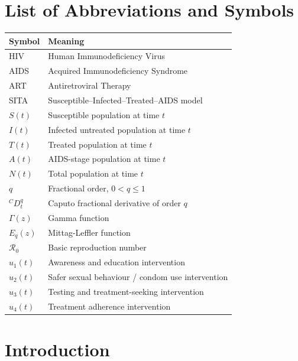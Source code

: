 \documentclass[12pt,a4paper,oneside]{report}
\newcommand{\Rzero}{\mathcal{R}_0}
\newcommand{\CaputoD}[2]{{}^{C}D_{#1}^{#2}}
\begin{document}
\newpage
\tableofcontents
\newpage
\listoffigures
{}
\newpage
\listoftables
{}
\newpage

\chapter*{List of Abbreviations and Symbols}
\begin{longtable}{p{3cm}p{10cm}}
\toprule
\textbf{Symbol} & \textbf{Meaning}\\
\midrule
HIV & Human Immunodeficiency Virus\\
AIDS & Acquired Immunodeficiency Syndrome\\
ART & Antiretroviral Therapy\\
SITA & Susceptible--Infected--Treated--AIDS model\\
$S(t)$ & Susceptible population at time $t$\\
$I(t)$ & Infected untreated population at time $t$\\
$T(t)$ & Treated population at time $t$\\
$A(t)$ & AIDS-stage population at time $t$\\
$N(t)$ & Total population at time $t$\\
$q$ & Fractional order, $0<q\leq 1$\\
$\CaputoD{t}{q}$ & Caputo fractional derivative of order $q$\\
$\Gamma(z)$ & Gamma function\\
$E_q(z)$ & Mittag-Leffler function\\
$\Rzero$ & Basic reproduction number\\
$u_1(t)$ & Awareness and education intervention\\
$u_2(t)$ & Safer sexual behaviour / condom use intervention\\
$u_3(t)$ & Testing and treatment-seeking intervention\\
$u_4(t)$ & Treatment adherence intervention\\
\bottomrule
\end{longtable}

\newpage
{}

\chapter{Introduction}
\end{document}
